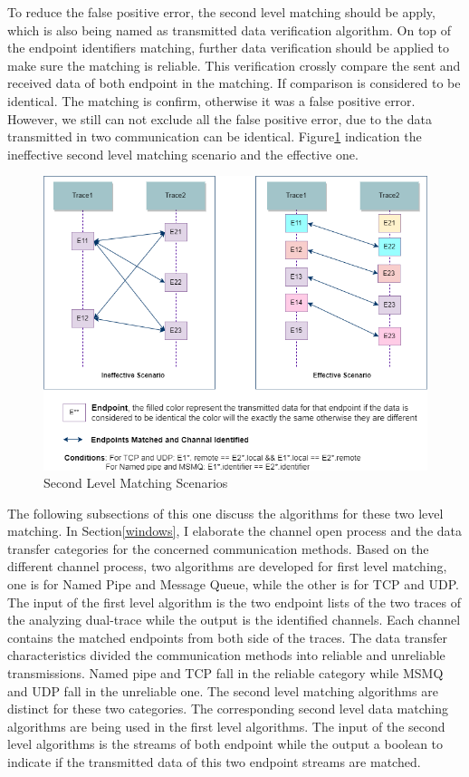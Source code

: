 To reduce the false positive error, the second level matching should be apply, which is also being named as transmitted data verification algorithm. On top of the endpoint identifiers matching, further data verification should be applied to make sure the matching is reliable. This verification crossly compare the sent and received data of both endpoint in the matching. If comparison is considered to be identical. The matching is confirm, otherwise it was a false positive error. However, we still can not exclude all the false positive error, due to the data transmitted in two communication can be identical. Figure\ref{secondlevelmatching} indication the ineffective second level matching scenario and the effective one.

\begin{figure}[H]
\centerline{\includegraphics[scale=0.55]{Figures/secondlevelmatching}}
 \caption{Second Level Matching Scenarios}
\label{secondlevelmatching}
\end{figure}


The following subsections of this one discuss the algorithms for these two level matching. In Section\ref{windows}, I elaborate the channel open process and the data transfer categories for the concerned communication methods. Based on the different channel process, two algorithms are developed for first level matching, one is for Named Pipe and Message Queue, while the other is for TCP and UDP. The input of the first level algorithm is the two endpoint lists of the two traces of the analyzing dual-trace while the output is the identified channels. Each channel contains the matched endpoints from both side of the traces. The data transfer characteristics divided the communication methods into reliable and unreliable transmissions. Named pipe and TCP fall in the reliable category while MSMQ and UDP fall in the unreliable one. The second level matching algorithms are distinct for these two categories. The corresponding second level data matching algorithms are being used in the first level algorithms. The input of the second level algorithms is the streams of both endpoint while the output a boolean to indicate if the transmitted data of this two endpoint streams are matched.

